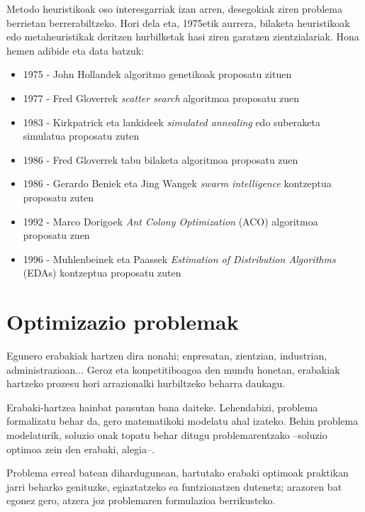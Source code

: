\documentclass[eu]{ifirak}\usepackage[]{graphicx}\usepackage[]{color}
\begin{document}
Metodo heuristikoak oso interesgarriak izan arren, desegokiak ziren problema berrietan berrerabiltzeko. Hori dela eta, 1975etik aurrera, bilaketa heuristikoak edo metaheuristikak deritzen hurbilketak hasi ziren garatzen zientzialariak. Hona hemen adibide eta data batzuk:

\begin{itemize}
\item 1975 - John Hollandek algoritmo genetikoak proposatu zituen
\item 1977 - Fred Gloverrek \textit{scatter search} algoritmoa proposatu zuen
\item 1983 - Kirkpatrick eta lankideek \textit{simulated annealing} edo suberaketa simulatua proposatu zuten
\item 1986 - Fred Gloverrek tabu bilaketa algoritmoa proposatu zuen
\item 1986 - Gerardo Beniek eta Jing Wangek \textit{swarm intelligence} kontzeptua proposatu zuten
\item 1992 - Marco Dorigoek \textit{Ant Colony Optimization} (ACO) algoritmoa proposatu zuen
\item 1996 - Muhlenbeinek eta Paassek \textit{Estimation of Distribution Algorithms} (EDAs) kontzeptua proposatu zuten
\end{itemize}

\section{Optimizazio problemak}\label{sec:opt_problemak}

Egunero erabakiak hartzen dira nonahi; enpresatan, zientzian, industrian, administrazioan... Geroz eta konpetitiboagoa den mundu honetan, erabakiak hartzeko prozesu hori arrazionalki hurbiltzeko beharra daukagu.

Erabaki-hartzea hainbat pausutan bana daiteke. Lehendabizi, problema formalizatu behar da, gero matematikoki modelatu ahal izateko. Behin problema modelaturik, soluzio onak topatu behar ditugu problemarentzako --soluzio optimoa zein den erabaki, alegia--. 

Problema erreal batean dihardugunean, hartutako erabaki optimoak praktikan jarri beharko genituzke, egiaztatzeko ea funtzionatzen dutenetz; arazoren bat egonez gero, atzera joz problemaren formulazioa berrikusteko.
\end{document}
